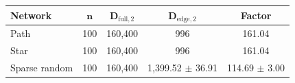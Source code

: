 \begingroup
\small
\setlength{\tabcolsep}{4pt}
\begin{tabular}{lcccc}
\toprule
\textbf{Network} & $\mathbf{n}$ & $\mathbf{D}_{\mathrm{full},2}$ & $\mathbf{D}_{\mathrm{edge},2}$ & \textbf{Factor} \\
\midrule
Path & 100 & 160,400 & 996 & 161.04 \\
Star & 100 & 160,400 & 996 & 161.04 \\
Sparse random & 100 & 160,400 & 1,399.52 $\pm$ 36.91 & 114.69 $\pm$ 3.00 \\
\bottomrule
\end{tabular}
\endgroup
